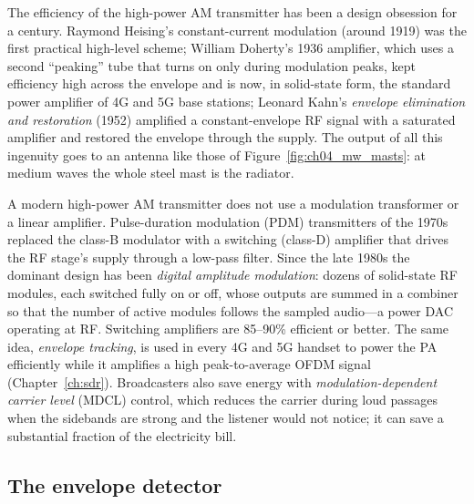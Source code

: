 The efficiency of the high-power AM transmitter has been a design obsession for a century. Raymond
Heising's constant-current modulation (around 1919) was the first practical high-level scheme; William
Doherty's 1936 amplifier, which uses a second ``peaking'' tube that turns on only during modulation
peaks, kept efficiency high across the envelope and is now, in solid-state form, the standard power
amplifier of 4G and 5G base stations; Leonard Kahn's \emph{envelope elimination and restoration} (1952)
amplified a constant-envelope RF signal with a saturated amplifier and restored the envelope through the
supply. The output of all this ingenuity goes to an antenna like those of
Figure~\ref{fig:ch04_mw_masts}: at medium waves the whole steel mast is the radiator.


\begin{inpractice}[title=Modern AM transmitters]
A modern high-power AM transmitter does not use a modulation transformer or a linear amplifier.
Pulse-duration modulation (PDM) transmitters of the 1970s replaced the class-B modulator with a
switching (class-D) amplifier that drives the RF stage's supply through a low-pass filter. Since the
late 1980s the dominant design has been \emph{digital amplitude modulation}: dozens of solid-state RF
modules, each switched fully on or off, whose outputs are summed in a combiner so that the number of
active modules follows the sampled audio---a power DAC operating at RF. Switching amplifiers are
85--90\% efficient or better. The same idea, \emph{envelope tracking}, is used in every 4G and 5G
handset to power the PA efficiently while it amplifies a high peak-to-average OFDM signal
(Chapter~\ref{ch:sdr}). Broadcasters also save energy with \emph{modulation-dependent carrier level}
(MDCL) control, which reduces the carrier during loud passages when the sidebands are strong and the
listener would not notice; it can save a substantial fraction of the electricity bill.
\end{inpractice}

\subsection{The envelope detector}
\label{sec:ch04:envdet}

